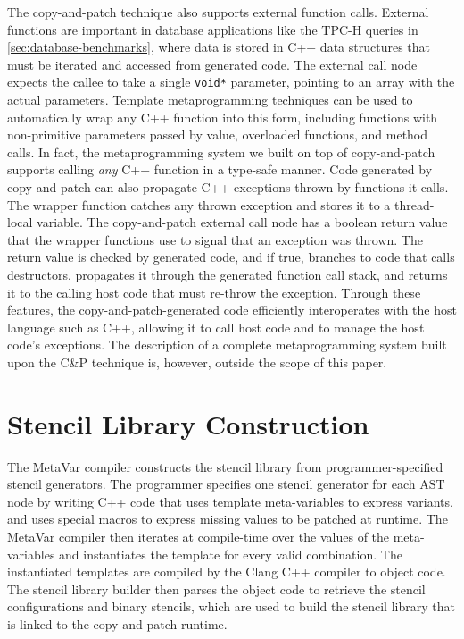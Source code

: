 \documentclass[acmsmall,nonacm,screen]{acmart}\settopmatter{printfolios=true,printccs=true,printacmref=false}
\newcommand{\secref}[1]{\autoref{#1}}
\newcommand\code[1]{\lstinline[mathescape=true,basicstyle=\ttfamily\normalsize]|#1|}
\newcommand{\cp}{copy-and-patch}
\newcommand{\cpshort}{C\&P}
\begin{document}
The \cp{} technique also supports external function calls. External functions are important in database applications like the TPC-H queries in \secref{sec:database-benchmarks}, where data is stored in C++ data structures that must be iterated and accessed from generated code. The external call node expects the callee to take a single \code{void*} parameter, pointing to an array with the actual parameters. Template metaprogramming techniques can be used to automatically wrap any C++ function into this form, including functions with non-primitive parameters passed by value, overloaded functions, and method calls. In fact, the metaprogramming system we built on top of \cp{} supports calling \textit{any} C++ function in a type-safe manner. Code generated by \cp{} can also propagate C++ exceptions thrown by functions it calls. The wrapper function catches any thrown exception and stores it to a thread-local variable. The \cp{} external call node has a boolean return value that the wrapper functions use to signal that an exception was thrown. The return value is checked by generated code, and if true, branches to code that calls destructors, propagates it through the generated function call stack, and returns it to the calling host code that must re-throw the exception. Through these features, the copy-and-patch-generated code efficiently interoperates with the host language such as C++, allowing it to call host code and to manage the host code's exceptions. The description of a complete metaprogramming system built upon the \cpshort{} technique is, however, outside the scope of this paper.



\section{Stencil Library Construction}
\label{sec: stencil-library-construction}

The MetaVar compiler constructs the stencil library from programmer-specified stencil generators. The programmer specifies one stencil generator for each AST node by writing C++ code that uses template meta-variables to express variants, and uses special macros to express missing values to be patched at runtime. The MetaVar compiler then iterates at compile-time over the values of the meta-variables and instantiates the template for every valid combination. The instantiated templates are compiled by the Clang C++ compiler to object code. The stencil library builder then parses the object code to retrieve the stencil configurations and binary stencils, which are used to build the stencil library that is linked to the \cp{} runtime.
\end{document}
